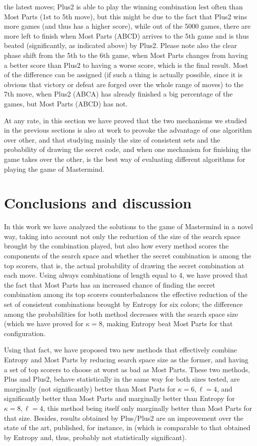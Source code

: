 \documentclass[preprint,12pt]{elsarticle}
\begin{document}
the latest moves;  Plus2 is able to play the winning
combination lest often than Most Parts (1st to 5th move), but this
might be due to the fact that Plus2 wins more games (and thus has a
higher score), while out of the 5000 games, there are more left to
finish when Most Parts (ABCD) arrives to the 5th game and is thus
beated (significantly, as indicated above) by Plus2. Please note also
the clear phase shift from the 5th to the 6th game, when Most Parts
changes from having a better score than Plus2 to having a worse score,
which is the final result. Most of the difference can be assigned (if
such a thing is actually possible, since it is obvious that victory or
defeat are forged over the whole range of moves) to the 7th move, when
Plus2 (ABCA) has already finished a big percentage of the games, but
Most Parts (ABCD) has not. 

At any rate, in this section we have proved that the two mechanisms we
studied in the previous sections is also at work to provoke the
advantage of one algorithm over other, and that studying mainly
the size of consistent sets and the probability of drawing the secret code,
and when one mechanism for finishing the game takes over the other, is
the best way of evaluating different algorithms for playing the game
of Mastermind. 


\section{Conclusions and discussion}
\label{s:c}

In this work we have analyzed the solutions to the game of Mastermind
in a novel way, taking into account not only the reduction of the size
of the search space brought by the combination played, but also how
every method scores the components of the search space and whether the
secret combination is among the top scorers, that is, the actual
probability of drawing the secret combination at each move. Using
always combinations of length equal to 4, we have proved that the
fact that Most Parts has an increased chance of finding the secret
combination among its top scorers counterbalances the effective
reduction of the set of consistent combinations brought by Entropy for
six colors; the difference among the probabilities for both method decreases with
the search space size (which we have proved for $\kappa=8$,
making Entropy beat Most Parts for that configuration.

Using that fact, we have proposed two new methods that effectively
combine Entropy and Most Parts by reducing search space size as the
former, and having a set of top scorers to choose at worst as bad as
Most Parts. These two methods, Plus and Plus2, behave statistically in
the same way for both sizes tested, are marginally (not significantly)
better than Most Parts for $\kappa=6, \ell=4$, and significantly
better than Most Parts and marginally better than Entropy for
$\kappa=8, \ell=4$, this method being itself only marginally better
than Most Parts for that size. Besides, results obtained by Plus/Plus2
are an improvement over the state of the art, published, for instance,
in \cite{DBLP:conf/cec/GuervosMC11} (which is comparable to that
obtained by Entropy and, thus, probably not statistically
significant). 
\end{document}
